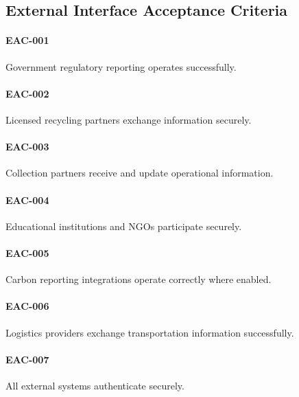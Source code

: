 
\subsection*{External Interface Acceptance Criteria}

\paragraph{EAC-001}

Government regulatory reporting operates successfully.

\paragraph{EAC-002}

Licensed recycling partners exchange information securely.

\paragraph{EAC-003}

Collection partners receive and update operational information.

\paragraph{EAC-004}

Educational institutions and NGOs participate securely.

\paragraph{EAC-005}

Carbon reporting integrations operate correctly where enabled.

\paragraph{EAC-006}

Logistics providers exchange transportation information successfully.

\paragraph{EAC-007}

All external systems authenticate securely.

